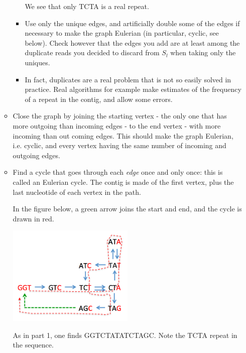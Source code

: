 \documentclass[a4paper,11pt]{article}
\begin{document}
\begin{enumerate}
\begin{itemize}
\begin{itemize}
		        We see that only TCTA is a real repeat.
		\item Use only the unique edges, and artificially double some of the edges if necessary to make the graph Eulerian
		  	(in particular, cyclic, see below).
			Check however that the edges you add are at least among the duplicate reads you decided to discard from $S_l$ when taking only the uniques.
		\item In fact, duplicates are a real problem that is not so easily solved in practice. Real algorithms for example make estimates of the frequency of a repeat in the contig, and allow some errors. 
		\end{itemize}
	\item Close the graph by joining the starting vertex - the only one that has more outgoing than incoming edges - to the end vertex - with more incoming than out coming edges. This should make the graph Eulerian, i.e. cyclic, and every vertex having the same number of incoming and outgoing edges.
	\item Find a cycle that goes through each \textit{edge} once and only once: this is called an Eulerian cycle. The contig is made of the first vertex, plus the last nucleotide of each vertex in the path. 
	
	In the figure below, a green arrow joins the start and end, and the cycle is drawn in red.
		\begin{center}
		\includegraphics[width=0.5\textwidth]{eulerian.png}\\
		\end{center}
		As in part 1, one finds GGTCTATATCTAGC. Note the TCTA repeat in the sequence.
	\end{itemize}

\end{enumerate}
\end{document}
